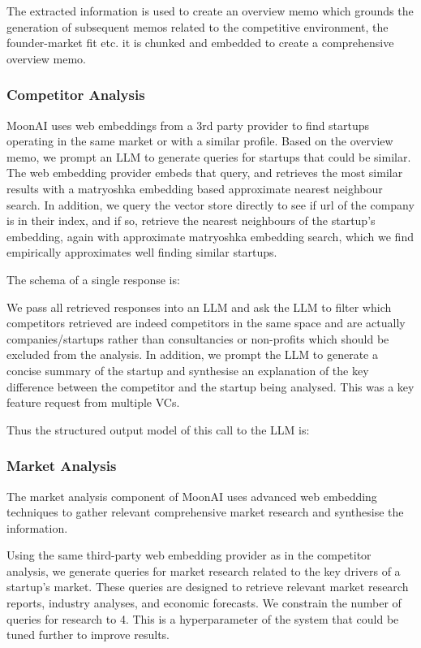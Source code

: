 \documentclass[a4paper, oneside]{discothesis}
\begin{document}
The extracted information is used to create an overview memo which grounds the generation of subsequent memos related to the competitive environment, the founder-market fit etc. it is chunked and embedded to create a comprehensive overview memo. 

\subsubsection{Competitor Analysis}
MoonAI uses web embeddings from a 3rd party provider to find startups operating in the same market or with a similar profile. Based on the overview memo, we prompt an LLM to generate queries for startups that could be similar. The web embedding provider embeds that query, and retrieves the most similar results with a matryoshka embedding based approximate nearest neighbour search. In addition, we query the vector store directly to see if url of the company is in their index, and if so, retrieve the nearest neighbours of the startup's embedding, again with approximate matryoshka embedding search, which we find empirically approximates well finding similar startups. 

The schema of a single response is:

We pass all retrieved responses into an LLM and ask the LLM to filter which competitors retrieved are indeed competitors in the same space and are actually companies/startups rather than consultancies or non-profits which should be excluded from the analysis. In addition, we prompt the LLM to generate a concise summary of the startup and synthesise an explanation of the key difference between the competitor and the startup being analysed. This was a key feature request from multiple VCs.

Thus the structured output model of this call to the LLM is:

\subsubsection{Market Analysis}
The market analysis component of MoonAI uses advanced web embedding techniques to gather relevant comprehensive market research and synthesise the information. 

Using the same third-party web embedding provider as in the competitor analysis, we generate queries for market research related to the key drivers of a startup's market. These queries are designed to retrieve relevant market research reports, industry analyses, and economic forecasts. We constrain the number of queries for research to 4. This is a hyperparameter of the system that could be tuned further to improve results. 
\end{document}
